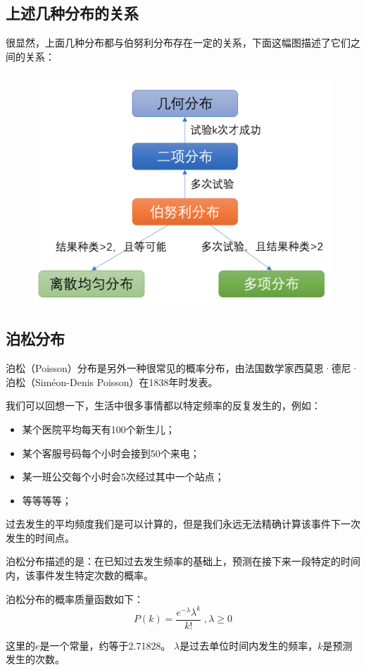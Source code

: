 \documentclass[12pt]{article}
\begin{document}
\subsection{上述几种分布的关系}
很显然，上面几种分布都与伯努利分布存在一定的关系，下面这幅图描述了它们之间的关系：
\begin{figure}[H]
  \centering
  \includegraphics[width=.8\textwidth]{fig/bernoulli_related.png} 
\end{figure}

\subsection{泊松分布}
泊松（Poisson）分布是另外一种很常见的概率分布，由法国数学家西莫恩·德尼·泊松（Siméon-Denis Poisson）在1838年时发表。

我们可以回想一下，生活中很多事情都以特定频率的反复发生的，例如：
\begin{itemize}
    \item 某个医院平均每天有100个新生儿；
    \item 某个客服号码每个小时会接到50个来电；
    \item 某一班公交每个小时会5次经过其中一个站点；
    \item 等等等等；
\end{itemize}

过去发生的平均频度我们是可以计算的，但是我们永远无法精确计算该事件下一次发生的时间点。

泊松分布描述的是：在已知过去发生频率的基础上，预测在接下来一段特定的时间内，该事件发生特定次数的概率。

泊松分布的概率质量函数如下：
$$
P(k) = \frac{e^{-\lambda}\lambda^{k}}{k!} \; ,\lambda \ge 0
$$

这里的$e$是一个常量，约等于2.71828。
$\lambda$是过去单位时间内发生的频率，$k$是预测发生的次数。
\end{document}
